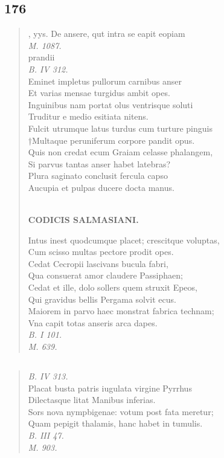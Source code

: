 \documentclass[11pt, a4paper]{report}
\begin{document}
            \subsection*{176}
      \begin{verse}
      , yys. De ansere, qut intra se eapit eopiam \\ \textit{M. 1087.} \\ prandii \\ \textit{B. IV 312.} \\ Eminet impletus pullorum carnibus anser \\ Et varias mensae turgidus ambit opes. \\ Inguinibus nam portat olus ventrisque soluti \\ Truditur e medio esitiata nitens. \\ Fulcit utrumque latus turdus cum turture pinguis \\ †Multaque peruniferum corpore pandit opus. \\ Quis non credat ecum Graiam celasse phalangem, \\ Si parvus tantas anser habet latebras? \\ Plura saginato conclusit fercula capso \\ Aucupia et pulpas ducere docta manus. \\ 
        ﻿\pagebreak 
    \begin{center} \textbf{CODICIS SALMASIANI.} \end{center} \marginpar{[153]} Intus inest quodcumque placet; crescitque voluptas, \\ Cum scisso multas pectore prodit opes. \\ Cedat Cecropii lascivans bucula fabri, \\ Qua consuerat amor claudere Passiphaen; \\ Cedat et ille, dolo sollers quem struxit Epeos, \\ Qui gravidus bellis Pergama solvit ecus. \\ Maiorem in parvo haec monstrat fabrica technam; \\ Vna capit totas anseris arca dapes. \\ \textit{B. I 101.} \\ \textit{M. 639.} \\ 
      \end{verse}
  
            \subsection*{}
      \begin{verse}
      \textit{B. IV 313.} \\ Placat busta patris iugulata virgine Pyrrhus \\ Dilectasque litat Manibus inferias. \\ Sors nova nympbigenae: votum post fata meretur; \\ Quam pepigit thalamis, hanc habet in tumulis. \\ \textit{B. III 47.} \\ \textit{M. 903.} \\ 
      \end{verse}
  
\end{document}
